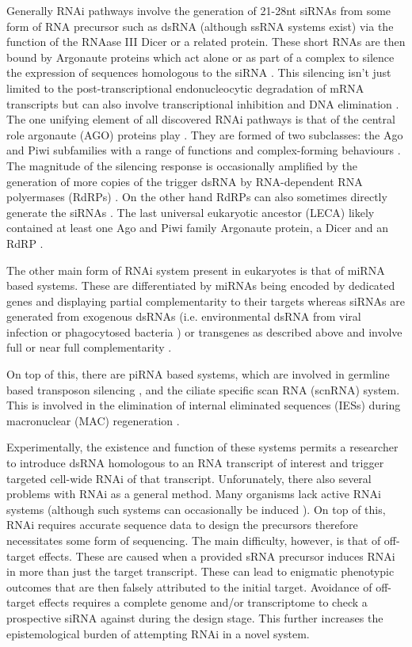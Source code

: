 Generally RNAi pathways involve the generation of 21-28nt siRNAs
from some form of RNA precursor such as dsRNA (although ssRNA systems exist)
via the function of the RNAase III Dicer \citep{Bernstein2001} or a related protein. 
These short RNAs are then bound by Argonaute proteins which act alone or as part
of a complex to silence the expression of sequences homologous to the siRNA \citep{Ketting2011}.
This silencing isn't just limited to the post-transcriptional endonucleocytic degradation of 
mRNA transcripts but can also involve transcriptional inhibition and
DNA elimination \citep{Marker2014}.
The one unifying element of all discovered RNAi pathways is that
of the central role argonaute (AGO) proteins play \citep{Ketting2011}.
They are formed of two subclasses: the Ago and Piwi subfamilies \citep{Peters2007}
with a range of functions and complex-forming behaviours
\citep{Ender2010}.
The magnitude of the silencing response is occasionally amplified by the generation
of more copies of the trigger dsRNA by RNA-dependent RNA polyermases (RdRPs) \citep{Arp2007}.
On the other hand RdRPs can also sometimes directly generate the siRNAs \citep{Aoki2007,Ketting2011}.
The last universal eukaryotic ancestor (LECA) likely contained 
at least one Ago and Piwi family Argonaute protein, a Dicer and an RdRP \citep{Cerutti2006}.

The other main form of RNAi system present in eukaryotes is that of 
miRNA based systems.  These are differentiated
by miRNAs being encoded by dedicated genes and displaying partial
complementarity to their targets whereas siRNAs are generated from exogenous
dsRNAs (i.e. environmental dsRNA from viral infection or phagocytosed bacteria \citep{Whangbo2008})
or transgenes as described above and involve full or near full complementarity \citep{Shabalina2008}.

On top of this, there are piRNA based systems, which are involved in germline based transposon 
silencing \citep{Iwasaki2015}, and the ciliate specific scan RNA (scnRNA) system.
This is involved in the elimination of internal eliminated sequences (IESs) during
macronuclear (MAC) regeneration \citep{Mochizuki2004,Kiefer2013}.


Experimentally, the existence and function of these systems
permits a researcher to introduce dsRNA homologous to an RNA transcript of interest
and trigger targeted cell-wide RNAi of that transcript.
Unforunately, there also several problems with RNAi as a general method.
Many organisms lack active RNAi systems (although such systems can occasionally
be induced \citep{Alibu2005}).
On top of this, RNAi requires accurate sequence data to design the precursors
therefore necessitates some form of sequencing. 
The main difficulty, however, is that of off-target effects.
These are caused when a provided sRNA precursor induces RNAi
in more than just the target transcript.  These
can lead to enigmatic phenotypic outcomes that 
are then falsely attributed to the initial target.
Avoidance of off-target effects 
requires a complete genome and/or transcriptome
to check a prospective siRNA against during the design
stage.  This further increases the epistemological
burden of attempting RNAi in a novel system.

